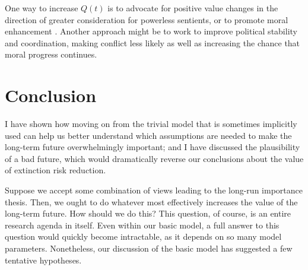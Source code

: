\documentclass[british]{article}
\begin{document}
One way to increase $Q(t)$ is to advocate for positive value changes in the direction of greater consideration for powerless sentients, or to promote moral enhancement \citep{persson_perils_2008}. Another approach might be to work to improve political stability and coordination, making conflict less likely as well as increasing the chance that moral progress continues.


\section{Conclusion}\label{header-n298}
I have shown how moving on from the trivial model that is sometimes implicitly used can help us better understand which assumptions are needed to make the long-term future overwhelmingly important; and I have discussed the plausibility of a bad future, which would dramatically reverse our conclusions about the value of extinction risk reduction.

Suppose we accept some combination of views leading to the long-run importance thesis. Then, we ought to do whatever most effectively increases the value of the long-term future. How should we do this? This question, of course, is an entire research agenda in itself. Even within our basic model, a full answer to this question would quickly become intractable, as it depends on so many model parameters. Nonetheless, our discussion of the basic model has suggested a few tentative hypotheses.
\pagebreak
\tableofcontents

\end{document}
